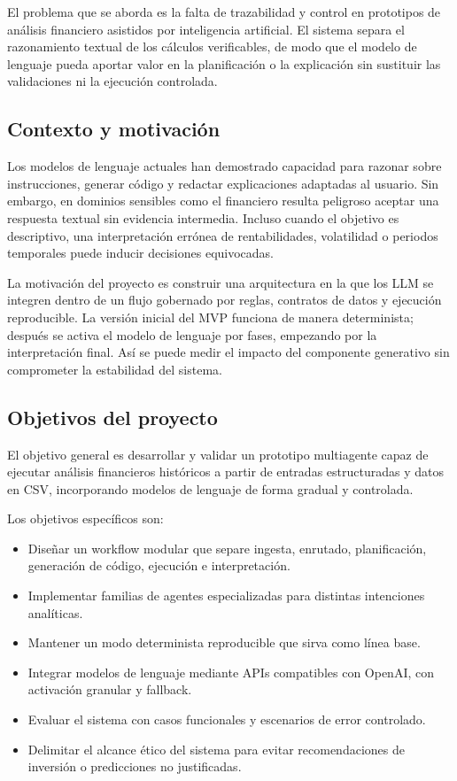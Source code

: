 \documentclass[11pt,a4paper]{article}
\begin{document}
El problema que se aborda es la falta de trazabilidad y control en prototipos de an\'alisis financiero asistidos por inteligencia artificial. El sistema separa el razonamiento textual de los c\'alculos verificables, de modo que el modelo de lenguaje pueda aportar valor en la planificaci\'on o la explicaci\'on sin sustituir las validaciones ni la ejecuci\'on controlada.

\subsection{Contexto y motivaci\'on}

Los modelos de lenguaje actuales han demostrado capacidad para razonar sobre instrucciones, generar c\'odigo y redactar explicaciones adaptadas al usuario. Sin embargo, en dominios sensibles como el financiero resulta peligroso aceptar una respuesta textual sin evidencia intermedia. Incluso cuando el objetivo es descriptivo, una interpretaci\'on err\'onea de rentabilidades, volatilidad o periodos temporales puede inducir decisiones equivocadas.

La motivaci\'on del proyecto es construir una arquitectura en la que los LLM se integren dentro de un flujo gobernado por reglas, contratos de datos y ejecuci\'on reproducible. La versi\'on inicial del MVP funciona de manera determinista; despu\'es se activa el modelo de lenguaje por fases, empezando por la interpretaci\'on final. As\'i se puede medir el impacto del componente generativo sin comprometer la estabilidad del sistema.

\subsection{Objetivos del proyecto}

El objetivo general es desarrollar y validar un prototipo multiagente capaz de ejecutar an\'alisis financieros hist\'oricos a partir de entradas estructuradas y datos en CSV, incorporando modelos de lenguaje de forma gradual y controlada.

Los objetivos espec\'ificos son:

\begin{itemize}
    \item Dise\~nar un workflow modular que separe ingesta, enrutado, planificaci\'on, generaci\'on de c\'odigo, ejecuci\'on e interpretaci\'on.
    \item Implementar familias de agentes especializadas para distintas intenciones anal\'iticas.
    \item Mantener un modo determinista reproducible que sirva como l\'inea base.
    \item Integrar modelos de lenguaje mediante APIs compatibles con OpenAI, con activaci\'on granular y fallback.
    \item Evaluar el sistema con casos funcionales y escenarios de error controlado.
    \item Delimitar el alcance \'etico del sistema para evitar recomendaciones de inversi\'on o predicciones no justificadas.
\end{itemize}
\end{document}
